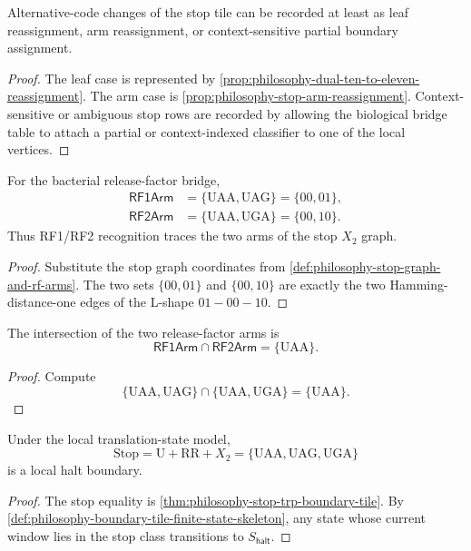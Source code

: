 \begin{corollary}
\label{cor:philosophy-stop-tile-deformation-modes}
Alternative-code changes of the stop tile can be recorded at least as
leaf reassignment, arm reassignment, or context-sensitive partial boundary
assignment.
\end{corollary}
\begin{proof}
The leaf case is represented by
\autoref{prop:philosophy-dual-ten-to-eleven-reassignment}. The arm case is
\autoref{prop:philosophy-stop-arm-reassignment}. Context-sensitive or
ambiguous stop rows are recorded by allowing the biological bridge table
to attach a partial or context-indexed classifier to one of the local
vertices.
\end{proof}

\begin{theorem}
\label{thm:philosophy-release-factor-stop-graph}
For the bacterial release-factor bridge,
$$
\begin{aligned}
  \mathsf{RF1Arm}&=\{\mathrm{UAA},\mathrm{UAG}\}=\{00,01\},\\
  \mathsf{RF2Arm}&=\{\mathrm{UAA},\mathrm{UGA}\}=\{00,10\}.
\end{aligned}
$$
Thus RF1/RF2 recognition traces the two arms of the stop $X_{2}$ graph.
\end{theorem}
\begin{proof}
Substitute the stop graph coordinates from
\autoref{def:philosophy-stop-graph-and-rf-arms}. The two sets
$\{00,01\}$ and $\{00,10\}$ are exactly the two Hamming-distance-one edges
of the L-shape $01-00-10$.
\end{proof}

\begin{corollary}
\label{cor:philosophy-uaa-local-stop-center}
The intersection of the two release-factor arms is
$$
  \mathsf{RF1Arm}\cap\mathsf{RF2Arm}=\{\mathrm{UAA}\}.
$$
\end{corollary}
\begin{proof}
Compute
$$
  \{\mathrm{UAA},\mathrm{UAG}\}
  \cap
  \{\mathrm{UAA},\mathrm{UGA}\}
  =
  \{\mathrm{UAA}\}.
$$
\end{proof}

\begin{theorem}
\label{thm:philosophy-stop-tile-local-halt-boundary}
Under the local translation-state model,
$$
  \mathrm{Stop}
  =
  \mathrm{U}+\mathrm{RR}+X_{2}
  =
  \{\mathrm{UAA},\mathrm{UAG},\mathrm{UGA}\}
$$
is a local halt boundary.
\end{theorem}
\begin{proof}
The stop equality is \autoref{thm:philosophy-stop-trp-boundary-tile}. By
\autoref{def:philosophy-boundary-tile-finite-state-skeleton}, any state
whose current window lies in the stop class transitions to
$S_{\mathsf{halt}}$.
\end{proof}

